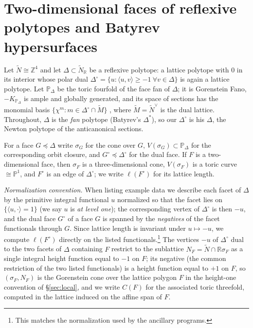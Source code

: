 \documentclass[11pt]{amsart}
\theoremstyle{definition}
\theoremstyle{remark}
\newcommand{\ZZ}{\mathbb{Z}}
\newcommand{\RR}{\mathbb{R}}
\newcommand{\PP}{\mathbb{P}}
\begin{document}
\section{Two-dimensional faces of reflexive polytopes and Batyrev
hypersurfaces}
\label{sec:planting}

Let $\widetilde N \cong \ZZ^4$ and let $\Delta \subset \widetilde N_\RR$ be a
reflexive polytope: a lattice polytope with $0$ in its interior whose polar
dual $\Delta^\circ=\{u : \langle u, v\rangle \ge -1 \ \forall v \in \Delta\}$
is again a lattice polytope.  Let $\PP_\Delta$ be the toric fourfold of the
face fan of $\Delta$; it is Gorenstein Fano, $-K_{\PP_\Delta}$ is ample and
globally generated, and its space of sections has the monomial basis
$\{\chi^m : m \in \Delta^\circ \cap \widetilde M\}$ \cite{Batyrev94,CLS}, where
$\widetilde M = \widetilde N^\vee$ is the dual lattice.  Throughout, $\Delta$ is the \emph{fan} polytope (Batyrev's
$\Delta^\ast$), so our $\Delta^\circ$ is his $\Delta$, the Newton polytope
of the anticanonical sections.

For a face $G \preceq \Delta$ write $\sigma_G$ for the cone over $G$,
$V(\sigma_G) \subset \PP_\Delta$ for the corresponding orbit closure, and
$G^\circ \preceq \Delta^\circ$ for the dual face.  If $F$ is a
two-dimensional face, then $\sigma_F$ is a three-dimensional cone,
$V(\sigma_F)$ is a toric curve $\cong \PP^1$, and $F^\circ$ is an edge of
$\Delta^\circ$; we write $\ell(F^\circ)$ for its lattice length.

\emph{Normalization convention.}  When listing example data we describe each
facet of $\Delta$ by the primitive integral functional $u$ normalized so that
the facet lies on $\{\langle u,\cdot\rangle = 1\}$ (we say $u$ is \emph{at
level one}); the corresponding vertex
of $\Delta^\circ$ is then $-u$, and the dual face $G^\circ$ of a face $G$ is
spanned by the \emph{negatives} of the facet functionals through $G$.  Since
lattice length is invariant under $u \mapsto -u$, we compute $\ell(F^\circ)$
directly on the listed functionals.\footnote{This matches the normalization
used by the ancillary programs.}  The
vertices $-u$ of $\Delta^\circ$ dual to the two facets of $\Delta$
containing $F$ restrict
to the sublattice $N_F = \widetilde N \cap \RR\sigma_F$ as a single integral
height function equal to $-1$ on $F$; its negative (the common
restriction of the two listed functionals) is a height function equal to
$+1$ on $F$, so $(\sigma_F, N_F)$ is the Gorenstein cone
over the lattice polygon $F$ in the height-one convention of
\S\ref{sec:local}, and we write $C(F)$ for the associated toric
threefold, computed in the lattice induced on the
affine span of $F$.
\end{document}
